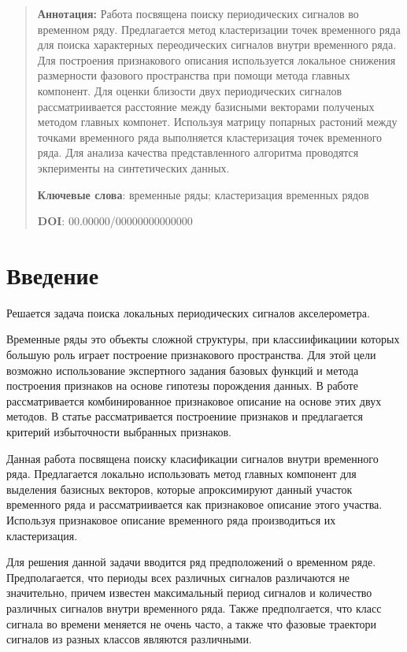 \documentclass[12pt, twoside]{article}
\begin{document}
{\centering\begin{quote}
\textbf{Аннотация:} Работа посвящена поиску периодических сигналов во временном ряду. Предлагается метод кластеризации точек временного ряда для поиска характерных переодических сигналов внутри временного ряда. Для построения признакового описания используется локальное снижения размерности фазового пространства при помощи метода главных компонент. Для оценки близости двух периодических сигналов рассматриивается расстояние между базисными векторами полученых методом главных компонет. Используя матрицу попарных растоний между точками временного ряда выполняется кластеризация точек временного ряда. Для анализа качества представленного алгоритма проводятся экперименты на синтетических данных.


\smallskip
\textbf{Ключевые слова}: временные ряды; кластеризация временных рядов

\smallskip
\textbf{DOI}: 00.00000/00000000000000
\end{quote}
}

\section{Введение}
Решается задача поиска локальных периодических сигналов акселерометра.

Временные ряды это объекты сложной структуры, при классиификациии которых большую роль играет построение признакового пространства. Для этой цели возможно использование экспертного задания базовых функций и метода построения признаков на основе гипотезы порождения данных. В работе \cite{Ivkin2015} рассматривается комбинированное признаковое описание на основе этих двух методов. В статье \cite{Katrutsa2015} рассматривается построениие признаков и предлагается критерий избыточности выбранных признаков.

Данная работа посвящена поиску класификации сигналов внутри временного ряда. Предлагается локально использовать метод главных компонент для выделения базисных векторов, которые апроксимируют данный участок временного ряда и рассматриивается как признаковое описание этого участва. Используя признаковое описание временного ряда производиться их кластеризация. 

Для решения данной задачи вводится ряд предположений о временном ряде. Предполагается, что периоды всех различных сигналов различаются не значительно, причем известен максимальный период сигналов и количество различных сигналов внутри временного ряда. Также предполгается, что класс сигнала во времени меняется не очень часто, а также что фазовые траектори сигналов из разных классов являются различными. 
\end{document}
